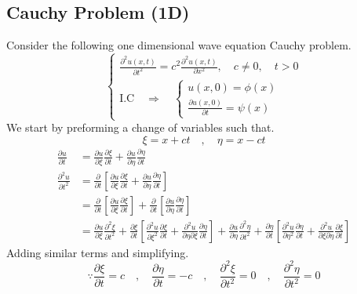 \subsection{Cauchy Problem (1D)}
Consider the following one dimensional wave equation Cauchy problem.
\begin{equation}
    \begin{cases}
        \displaystyle \frac{\partial^2 u\left(x,t \right)}{\partial t^2} = c^2\frac{\partial^2 u\left(x,t \right)}{\partial x^2},\quad c\neq 0,\quad t>0
        \\
        \text{I.C} \quad \Longrightarrow \quad 
        \begin{cases}
            u\left(x,0 \right) = \phi\left(x\right)
            \\
            \displaystyle \frac{\partial u\left(x,0 \right)}{\partial t} = \psi\left(x\right)
        \end{cases}
    \end{cases}
\end{equation}
We start by preforming a change of variables such that.
\[
    \xi = x+ct \quad , \quad \eta = x-ct    
\]
\begin{align*}
\frac{\partial u}{\partial t} &= \frac{\partial u}{\partial \xi}\frac{\partial \xi}{\partial t} + \frac{\partial u}{\partial \eta} \frac{\partial \eta}{\partial t}
\\
\frac{\partial^2 u}{\partial t^2} &= \frac{\partial}{\partial t}\left[ \frac{\partial u}{\partial \xi}\frac{\partial \xi}{\partial t} + \frac{\partial u}{\partial \eta} \frac{\partial \eta}{\partial t}\right]
\\
&= \frac{\partial}{\partial t}\left[ \frac{\partial u}{\partial \xi}\frac{\partial \xi}{\partial t}\right] + \frac{\partial}{\partial t}\left[\frac{\partial u}{\partial \eta} \frac{\partial \eta}{\partial t}\right]
\\
&= \frac{\partial u}{\partial \xi}\frac{\partial^2 \xi}{\partial t^2} + \frac{\partial \xi}{\partial t}\left[\frac{\partial^2 u}{\partial \xi^2}\frac{\partial \xi}{\partial t} + \frac{\partial^2 u}{\partial\eta \partial\xi}\frac{\partial \eta}{\partial t} \right]+\frac{\partial u}{\partial \eta}\frac{\partial^2 \eta}{\partial t^2}+\frac{\partial \eta}{\partial t}\left[\frac{\partial^2 u}{\partial \eta^2}\frac{\partial \eta}{\partial t}+\frac{\partial^2 u}{\partial\xi\partial\eta}\frac{\partial\xi}{\partial t}\right]
\end{align*}
Adding similar terms and simplifying.
\[
\because \frac{\partial\xi}{\partial t}=c \quad,\quad \frac{\partial\eta}{\partial t}=-c \quad,\quad \frac{\partial^2\xi}{\partial t^2}=0 \quad,\quad \frac{\partial^2\eta}{\partial t^2}=0    
\]
